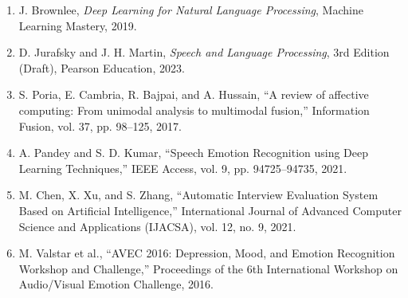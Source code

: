 \documentclass[12pt]{report}
\begin{document}
	\begin{enumerate}
		\item J. Brownlee, \textit{Deep Learning for Natural Language Processing}, Machine Learning Mastery, 2019.
		
		\item D. Jurafsky and J. H. Martin, \textit{Speech and Language Processing}, 3rd Edition (Draft), Pearson Education, 2023.
		
		\item S. Poria, E. Cambria, R. Bajpai, and A. Hussain, “A review of affective computing: From unimodal analysis to multimodal fusion,” Information Fusion, vol. 37, pp. 98–125, 2017.
		
		\item A. Pandey and S. D. Kumar, “Speech Emotion Recognition using Deep Learning Techniques,” IEEE Access, vol. 9, pp. 94725–94735, 2021.
		
		\item M. Chen, X. Xu, and S. Zhang, “Automatic Interview Evaluation System Based on Artificial Intelligence,” International Journal of Advanced Computer Science and Applications (IJACSA), vol. 12, no. 9, 2021.
		
		\item M. Valstar et al., “AVEC 2016: Depression, Mood, and Emotion Recognition Workshop and Challenge,” Proceedings of the 6th International Workshop on Audio/Visual Emotion Challenge, 2016.
		
	\end{enumerate}
	
\end{document}

